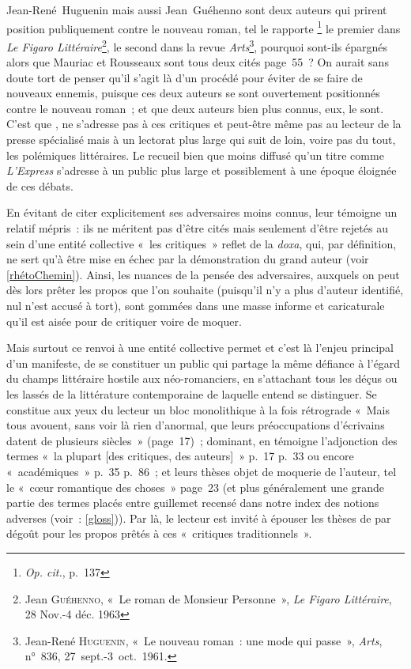 \documentclass[12pt, a4paper]{article}
\begin{document}
Jean-René~Huguenin mais aussi Jean~Guéhenno sont deux auteurs qui prirent position publiquement contre le nouveau roman, tel le rapporte \galia\footnote{\textit{Op. cit.}, p.~137} le premier dans \textit{Le Figaro Littéraire}\footnote{Jean \textsc{Guéhenno}, «~Le roman de Monsieur Personne~»,\textit{ Le Figaro Littéraire}, 28 Nov.-4 déc. 1963}, le second dans la revue \textit{Arts}\footnote{Jean-René \textsc{Huguenin}, «~Le nouveau roman~: une mode qui passe~», \textit{Arts}, n°~836, 27~sept.-3~oct.~1961.}, pourquoi sont-ils épargnés alors que Mauriac et Rousseaux sont tous deux cités page~55~? 
On aurait sans doute tort de penser qu'il s'agit là d'un procédé pour éviter de se faire de nouveaux ennemis, puisque ces deux auteurs se sont ouvertement positionnés contre le nouveau roman~; et que deux auteurs bien plus connus, eux, le sont. C'est que \punr, ne s'adresse pas à ces critiques et peut-être même pas au lecteur de la presse spécialisé mais à un lectorat plus large qui suit de loin, voire pas du tout, les polémiques littéraires. Le recueil bien que moins diffusé qu'un titre comme \textit{L'Express} s'adresse à un public plus large et possiblement à une époque éloignée de ces débats. 

En évitant de citer explicitement ses adversaires moins connus, \robbe{} leur témoigne un relatif mépris~: ils ne méritent pas d'être cités mais seulement d'être rejetés au sein d'une entité collective «~les critiques~» reflet de la \textit{doxa}, qui, par définition, ne sert qu'à être mise en échec par la démonstration du grand auteur (voir \ref{rhétoChemin}). Ainsi, les nuances de la pensée des adversaires, auxquels on peut dès lors prêter les propos que l'on souhaite (puisqu'il n'y a plus d'auteur identifié, nul n'est accusé à tort), sont gommées dans une masse informe et caricaturale qu'il est aisée pour \robbe{} de critiquer voire de moquer. %

Mais surtout ce renvoi à une entité collective permet et c'est là l'enjeu principal d'un manifeste, de se constituer un public qui partage la même défiance à l'égard du champs littéraire hostile aux néo-romanciers, en s'attachant tous les déçus ou les lassés de la littérature contemporaine de laquelle \robbe{} entend se distinguer. Se constitue aux yeux du lecteur un bloc monolithique à la fois rétrograde «~Mais tous avouent, sans voir là rien d’anormal, que leurs préoccupations d’écrivains datent de plusieurs siècles~» (page~17)~; dominant, en témoigne l'adjonction des termes «~la plupart [des critiques, des auteurs]~» p.~17 p.~33 ou encore «~académiques~» p.~35 p.~86~; et leurs thèses objet de moquerie de l'auteur, tel le «~cœur romantique des choses~» page~23 (et plus généralement une grande partie des termes placés entre guillemet recensé dans notre index des notions adverses (voir~: \ref{gloss})). Par là, le lecteur est invité à épouser les thèses de \punr{} par dégoût pour les propos prêtés à ces «~critiques traditionnels~».
\end{document}
